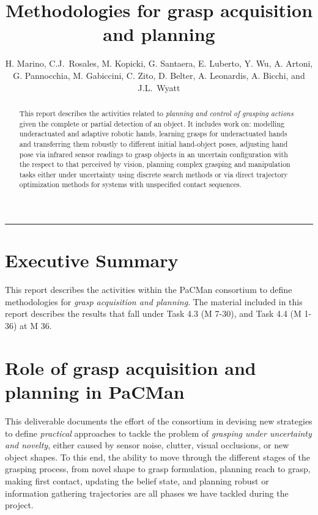 \documentclass[a4paper,11pt,pdf]{pacmanreport}
\title{Methodologies for grasp acquisition and planning}
\author{H. Marino, C.J.~Rosales, M. Kopicki, G. Santaera, E. Luberto, Y. Wu, A. Artoni, G. Pannocchia, M. Gabiccini, C. Zito, D. Belter, A. Leonardis, A. Bicchi, and J.L.~Wyatt}
\begin{document}
\maketitle

\begin{abstract}
\noindent This report describes the activities related to \emph{planning and  control of grasping actions} given the complete or partial detection of an object. It includes work on: modelling underactuated and adaptive robotic hands, learning grasps for underactuated hands and transferring them robustly to different initial hand-object poses, adjusting hand pose via infrared sensor readings to grasp objects in an uncertain configuration with the respect to that perceived by vision, planning complex grasping and manipulation tasks either under uncertainty using discrete search methods or via direct trajectory optimization methods for systems with unspecified contact sequences.
\end{abstract}


\vspace{.2em}
\hrule

\footnotesize

\tableofcontents

\normalsize

\newpage

\section*{Executive Summary}

This report describes the activities within the PaCMan consortium to define methodologies for \emph{grasp acquisition and planning}. The material included in this report describes the results that fall under Task 4.3 (M 7-30), and Task 4.4 (M 1-36) at M 36.

\section*{Role of grasp acquisition and planning in PaCMan}

This deliverable documents the effort of the consortium in devising new strategies to define \emph{practical} approaches to tackle the problem of \emph{grasping under uncertainty and novelty}, either caused by sensor noise, clutter, visual occlusions, or new object shapes. To this end, the ability to move through the different stages of the grasping process, from novel shape to grasp formulation, planning reach to grasp, making first contact, updating the belief state, and planning robust or information gathering trajectories are all phases we have tackled during the project.
\end{document}
